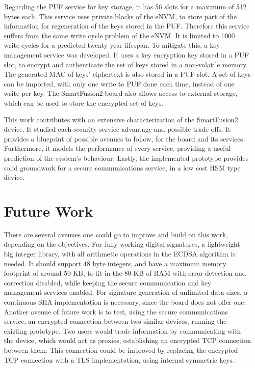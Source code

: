 Regarding the PUF service for key storage, it has 56 slots for a maximum of 512 bytes each. This service uses private blocks of the eNVM, to store part of the information for regeneration of the keys stored in the PUF. Therefore this service suffers from the same write cycle problem of the eNVM. It is limited to 1000 write cycles for a predicted twenty year lifespan. To mitigate this, a key management service was developed. It uses a key encryption key stored in a PUF slot, to encrypt and authenticate the set of keys stored in a non-volatile memory. The generated MAC of keys' ciphertext is also stored in a PUF slot. A set of keys can be imported, with only one write to PUF done each time, instead of one write per key. The SmartFusion2 board also allows access to external storage, which can be used to store the encrypted set of keys.

This work contributes with an extensive characterization of the SmartFusion2 device. It studied each security service advantage and possible trade offs. It provides a blueprint of possible avenues to follow, for the board and its services. Furthermore, it models the performance of every service, providing a useful prediction of the system's behaviour. Lastly, the implemented prototype provides solid groundwork for a secure communications service, in a low cost HSM type device.

\section{Future Work} \label{chap:conclusion:future-work}

There are several avenues one could go to improve and build on this work, depending on the objectives. For fully working digital signatures, a lightweight big integer library, with all arithmetic operations in the ECDSA algorithm is needed. It should support 48 byte integers, and have a maximum memory footprint of around 50 KB, to fit in the 80 KB of RAM with error detection and correction disabled, while keeping the secure communication and key management services enabled. For signature generation of unlimited data sizes, a continuous SHA implementation is necessary, since the board does not offer one.
Another avenue of future work is to test, using the secure communications service, an encrypted connection between two similar devices, running the existing prototype. Two users would trade information by communicating with the device, which would act as proxies, establishing an encrypted TCP connection between them. This connection could be improved by replacing the encrypted TCP connection with a TLS implementation, using internal symmetric keys.
